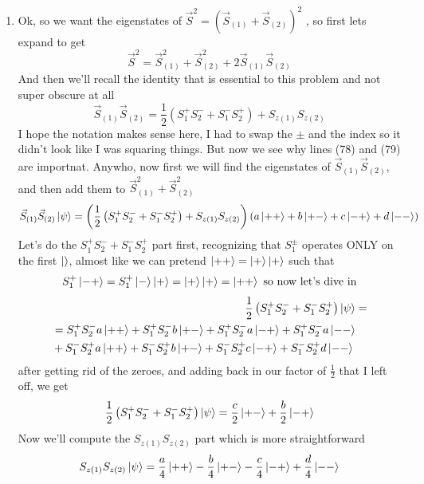 \documentclass{article}
\begin{document}
\begin{enumerate}[label=\alph*)]
	\item %
	Ok, so we want the eigenstates of $ \vec{S}^2 = \left(\vec{S}_{(1)} + \vec{S}_{(2)}\right)^2$ , so first lets expand to get
	\[ \vec{S}^2 = \vec{S}_{(1)}^2 + \vec{S}_{(2)}^2  + 2\vec{S}_{(1)}\vec{S}_{(2)}\]
	And then we'll recall the identity that is essential to this problem and not super obscure at all
	\[ \vec{S}_{(1)}\vec{S}_{(2)} = \frac{1}{2} \left( S_{1}^{+} S_{2}^{-} + S_{1}^{-} S_{2}^{+}\right) + S_{z(1)} S_{z(2)} \]
	I hope the notation makes sense here, I had to swap the $\pm$ and the index so it didn't look like I was squaring things. But now we see why lines (78) and (79) are importnat. Anywho, now first we will find the eigenstates of $\vec{S}_{(1)}\vec{S}_{(2)}$, and then add them to $\vec{S}_{(1)}^2 + \vec{S}_{(2)}^2$
	\begin{align}
		\vec{S}_{(1)}\vec{S}_{(2)} \ket{\psi} = \left(\frac{1}{2} \left( S_{1}^{+} S_{2}^{-} + S_{1}^{-} S_{2}^{+}\right) + S_{z(1)} S_{z(2)}\right)\left(a\ket{++} + b\ket{+-} + c\ket{-+} + d\ket{--} \right)
	\end{align}
	Let's do the $S_{1}^{+} S_{2}^{-} + S_{1}^{-} S_{2}^{+}$ part first, recognizing that $S_{1}^{\pm}$ operates ONLY on the first $\ket{}$, almost like we can pretend $\ket{++} = \ket{+}\ket{+}$ such that
	\[ S_{1}^{+} \ket{-+} = S_{1}^{+}\ket{-}\ket{+} = \ket{+}\ket{+} = \ket{++} \text{ so now let's dive in}\]
	\begin{align*}
		\frac{1}{2} \left( S_{1}^{+} S_{2}^{-} + S_{1}^{-} S_{2}^{+}\right)\ket{\psi}&= \\
		\begin{split}
		&=  S_{1}^{+} S_{2}^{-}a\ket{++} + S_{1}^{+} S_{2}^{-}b\ket{+-} + S_{1}^{+} S_{2}^{-}a\ket{-+} + S_{1}^{+} S_{2}^{-}a\ket{--} \\ 
		&+ S_{1}^{-} S_{2}^{+}a\ket{++} + S_{1}^{-} S_{2}^{+}b\ket{+-} + S_{1}^{-} S_{2}^{+}c\ket{-+} + S_{1}^{-} S_{2}^{+}d\ket{--}
		\end{split} \\
		\end{align*}
	after getting rid of the zeroes, and adding back in our factor of $\frac{1}{2}$ that I left off, we get \\
		\[ \frac{1}{2} \left( S_{1}^{+} S_{2}^{-} + S_{1}^{-} S_{2}^{+}\right)\ket{\psi}= \frac{c}{2}\ket{+-} + \frac{b}{2}\ket{-+} \]
	Now we'll compute the $S_{z(1)} S_{z(2)}$ part which is more straightforward
	\[
		S_{z(1)} S_{z(2)} \ket{\psi} = \frac{a}{4}\ket{++} - \frac{b}{4}\ket{+-} - \frac{c}{4}\ket{-+} + \frac{d}{4}\ket{--}
\]
\end{enumerate}
\end{document}
